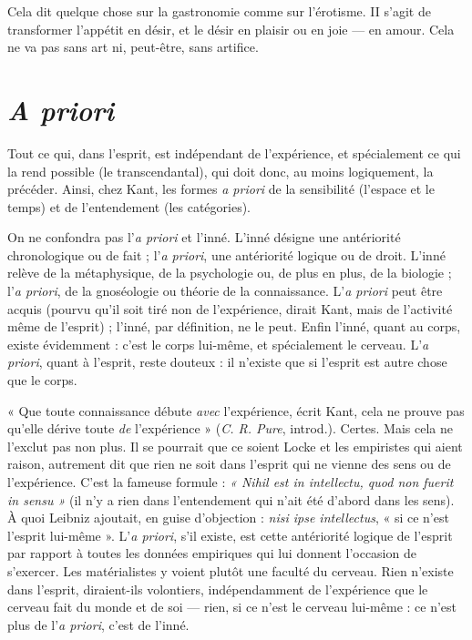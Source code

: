 Cela dit quelque chose sur la gastronomie comme sur l'érotisme. II s’agit de
transformer l’appétit en désir, et le désir en plaisir ou en joie — en amour. Cela
ne va pas sans art ni, peut-être, sans artifice.

\section{\it A priori}
Tout ce qui, dans l'esprit, est indépendant de l’expérience, et spécialement
ce qui la rend possible (le transcendantal), qui doit
donc, au moins logiquement, la précéder. Ainsi, chez Kant, les formes {\it a priori}
de la sensibilité (l’espace et le temps) et de l’entendement (les catégories).

On ne confondra pas l’{\it a priori} et l’inné. L’inné désigne une antériorité
chronologique ou de fait ; l’{\it a priori}, une antériorité logique ou de droit. L’inné
relève de la métaphysique, de la psychologie ou, de plus en plus, de la biologie ;
l’{\it a priori}, de la gnoséologie ou théorie de la connaissance. L’{\it a priori} peut être
acquis (pourvu qu’il soit tiré non de l’expérience, dirait Kant, mais de l’activité
même de l'esprit) ; l’inné, par définition, ne le peut. Enfin l’inné, quant au
corps, existe évidemment : c’est le corps lui-même, et spécialement le cerveau.
L’{\it a priori}, quant à l'esprit, reste douteux : il n’existe que si l’esprit est autre
chose que le corps.

« Que toute connaissance débute {\it avec} l'expérience, écrit Kant, cela ne
prouve pas qu’elle dérive toute {\it de} l’expérience » ({\it C. R. Pure}, introd.). Certes.
Mais cela ne l’exclut pas non plus. Il se pourrait que ce soient Locke et les
empiristes qui aient raison, autrement dit que rien ne soit dans l'esprit qui
ne vienne des sens ou de l’expérience. C’est la fameuse formule : {\it « Nihil est
in intellectu, quod non fuerit in sensu »} (il n’y a rien dans l’entendement qui
n'ait été d’abord dans les sens). À quoi Leibniz ajoutait, en guise d’objection :
{\it nisi ipse intellectus}, « si ce n’est l'esprit lui-même ». L’{\it a priori}, s’il
existe, est cette antériorité logique de l'esprit par rapport à toutes les données
empiriques qui lui donnent l’occasion de s'exercer. Les matérialistes y
voient plutôt une faculté du cerveau. Rien n’existe dans l'esprit, diraient-ils
volontiers, indépendamment de l’expérience que le cerveau fait du monde et
de soi — rien, si ce n’est le cerveau lui-même : ce n’est plus de l’{\it a priori}, c’est
de l’inné.

